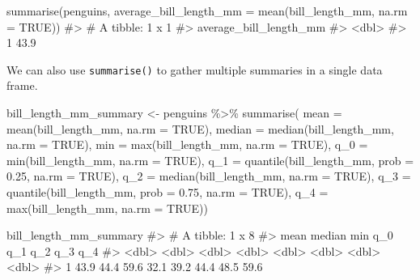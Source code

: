 \documentclass[
  letterpaper,
  DIV=11,
  numbers=noendperiod]{scrreprt}
\newenvironment{Shaded}{\begin{snugshade}}{\end{snugshade}}
\newcommand{\AttributeTok}[1]{\textcolor[rgb]{0.40,0.45,0.13}{#1}}
\newcommand{\CommentTok}[1]{\textcolor[rgb]{0.37,0.37,0.37}{#1}}
\newcommand{\ConstantTok}[1]{\textcolor[rgb]{0.56,0.35,0.01}{#1}}
\newcommand{\FloatTok}[1]{\textcolor[rgb]{0.68,0.00,0.00}{#1}}
\newcommand{\FunctionTok}[1]{\textcolor[rgb]{0.28,0.35,0.67}{#1}}
\newcommand{\NormalTok}[1]{\textcolor[rgb]{0.00,0.23,0.31}{#1}}
\newcommand{\OtherTok}[1]{\textcolor[rgb]{0.00,0.23,0.31}{#1}}
\newcommand{\SpecialCharTok}[1]{\textcolor[rgb]{0.37,0.37,0.37}{#1}}
\begin{document}
\begin{Shaded}
\begin{Highlighting}[]
\FunctionTok{summarise}\NormalTok{(penguins, }\AttributeTok{average\_bill\_length\_mm =} \FunctionTok{mean}\NormalTok{(bill\_length\_mm, }\AttributeTok{na.rm =} \ConstantTok{TRUE}\NormalTok{))}
\CommentTok{\#\textgreater{} \# A tibble: 1 x 1}
\CommentTok{\#\textgreater{}   average\_bill\_length\_mm}
\CommentTok{\#\textgreater{}                    \textless{}dbl\textgreater{}}
\CommentTok{\#\textgreater{} 1                   43.9}
\end{Highlighting}
\end{Shaded}

We can also use \texttt{summarise()} to gather multiple summaries in a
single data frame.

\begin{Shaded}
\begin{Highlighting}[]
\NormalTok{bill\_length\_mm\_summary }\OtherTok{\textless{}{-}}\NormalTok{ penguins }\SpecialCharTok{\%\textgreater{}\%} 
  \FunctionTok{summarise}\NormalTok{(}
    \AttributeTok{mean =} \FunctionTok{mean}\NormalTok{(bill\_length\_mm, }\AttributeTok{na.rm =} \ConstantTok{TRUE}\NormalTok{),}
    \AttributeTok{median =} \FunctionTok{median}\NormalTok{(bill\_length\_mm, }\AttributeTok{na.rm =} \ConstantTok{TRUE}\NormalTok{),}
    \AttributeTok{min =} \FunctionTok{max}\NormalTok{(bill\_length\_mm, }\AttributeTok{na.rm =} \ConstantTok{TRUE}\NormalTok{),}
    \AttributeTok{q\_0 =} \FunctionTok{min}\NormalTok{(bill\_length\_mm, }\AttributeTok{na.rm =} \ConstantTok{TRUE}\NormalTok{),}
    \AttributeTok{q\_1 =} \FunctionTok{quantile}\NormalTok{(bill\_length\_mm, }\AttributeTok{prob =} \FloatTok{0.25}\NormalTok{, }\AttributeTok{na.rm =} \ConstantTok{TRUE}\NormalTok{),}
    \AttributeTok{q\_2 =} \FunctionTok{median}\NormalTok{(bill\_length\_mm, }\AttributeTok{na.rm =} \ConstantTok{TRUE}\NormalTok{),}
    \AttributeTok{q\_3 =} \FunctionTok{quantile}\NormalTok{(bill\_length\_mm, }\AttributeTok{prob =} \FloatTok{0.75}\NormalTok{, }\AttributeTok{na.rm =} \ConstantTok{TRUE}\NormalTok{),}
    \AttributeTok{q\_4 =} \FunctionTok{max}\NormalTok{(bill\_length\_mm, }\AttributeTok{na.rm =} \ConstantTok{TRUE}\NormalTok{))}

\NormalTok{bill\_length\_mm\_summary}
\CommentTok{\#\textgreater{} \# A tibble: 1 x 8}
\CommentTok{\#\textgreater{}    mean median   min   q\_0   q\_1   q\_2   q\_3   q\_4}
\CommentTok{\#\textgreater{}   \textless{}dbl\textgreater{}  \textless{}dbl\textgreater{} \textless{}dbl\textgreater{} \textless{}dbl\textgreater{} \textless{}dbl\textgreater{} \textless{}dbl\textgreater{} \textless{}dbl\textgreater{} \textless{}dbl\textgreater{}}
\CommentTok{\#\textgreater{} 1  43.9   44.4  59.6  32.1  39.2  44.4  48.5  59.6}
\end{Highlighting}
\end{Shaded}
\end{document}
